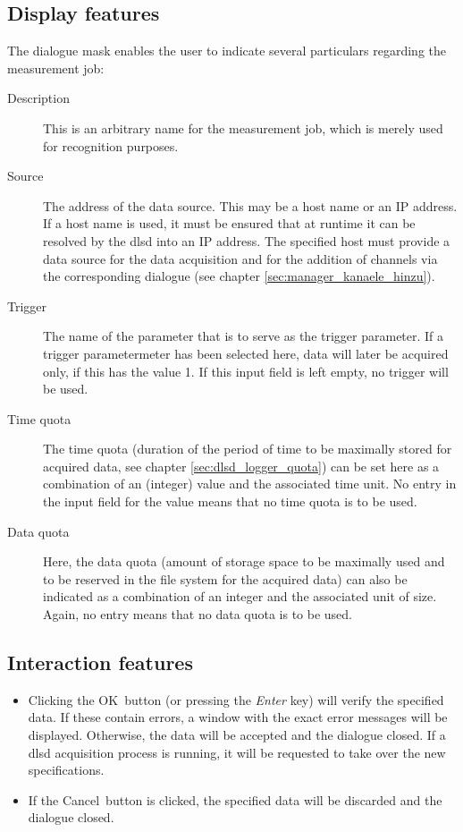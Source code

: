 \documentclass[a4paper,12pt,BCOR6mm,bibtotoc,idxtotoc]{scrbook}
\begin{document}

\subsection{Display features}

The dialogue mask enables the user to indicate several particulars regarding the measurement job:

\begin{description} 
\item[Description] This is an arbitrary name for the measurement job, which is merely used for recognition purposes. 
\item[Source] The address of the data source. This may be a host name or an IP address. If a host name is used, it must be ensured that at runtime it can be resolved by the dlsd into an IP address. The specified host must provide a data source for the data acquisition and for the addition of channels via the corresponding dialogue (see chapter \ref{sec:manager_kanaele_hinzu}). 
\item[Trigger] The name of the parameter that is to serve as the trigger parameter. If a trigger parameter\-meter  has been selected here, data will later be acquired only, if this has the value 1. If this input field is left empty, no trigger will be used. 
\item[Time quota] The time quota (duration of the period of time to be maximally stored for acquired data, see chapter \ref{sec:dlsd_logger_quota}) can be set here as a combination of an (integer) value and the associated time unit. No entry in the input field for the value means that no time quota is to be used. 
\item[Data quota] Here, the data quota (amount of storage space to be maximally used and to be reserved in the file system for the acquired data) can also be indicated as a combination of an integer and the associated unit of size. Again, no entry means that no data quota is to be used. \end{description}


\subsection{Interaction features}

\begin{itemize} 
\item Clicking the \glqq OK\grqq\  button (or pressing the \textit{Enter} key) will verify the specified data. If these contain errors, a window with the exact error messages will be displayed. Otherwise, the data will be accepted and the dialogue closed. If a dlsd acquisition process is running, it will be requested to take over the new specifications. 
\item If the \glqq Cancel\grqq\  button is clicked, the specified data will be discarded and the dialogue closed. \end{itemize}
\end{document}
